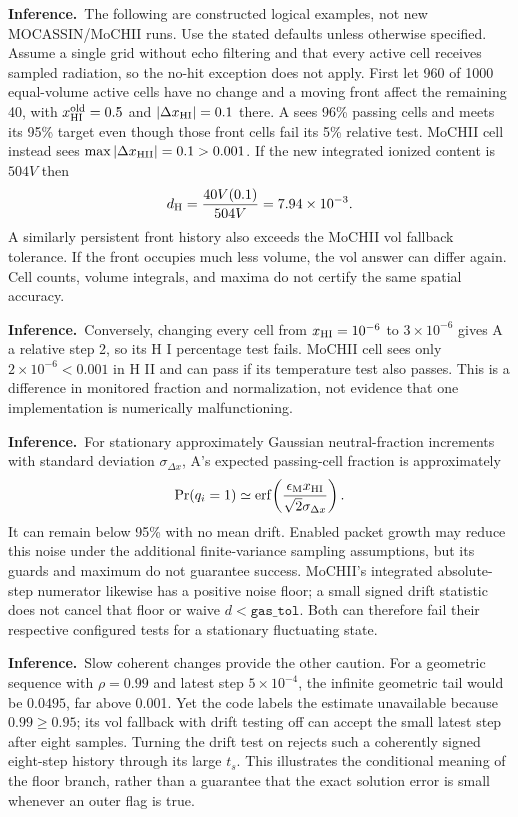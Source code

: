 \documentclass[english,a4paper]{my_memo}
\newcommand{\code}[1]{\texttt{#1}}
\newcommand{\Inferred}{\noindent\textbf{Inference.}\ }
\begin{document}
\Inferred The following are constructed logical examples, not new
MOCASSIN/MoCHII runs. Use the stated defaults unless otherwise specified.
Assume a single grid without echo filtering and that every active cell
receives sampled radiation, so the no-hit exception does not apply. First let 960 of 1000 equal-volume active
cells have no change and a
moving front affect the remaining 40, with $x_{\rm HI}^{\rm old}=0.5$
and $|\Delta x_{\rm HI}|=0.1$ there. A sees 96\% passing cells and meets
its 95\% target even though those front cells fail its 5\% relative test.
MoCHII cell instead sees $\max|\Delta x_{\rm HII}|=0.1>0.001$. If the
new integrated ionized content is $504V$ then
\begin{equation}
 d_{\rm H}=\frac{40V(0.1)}{504V}=7.94\times10^{-3}.
\end{equation}
A similarly persistent front history also exceeds the MoCHII vol
fallback tolerance. If the front occupies much less volume, the vol
answer can differ again. Cell counts, volume integrals, and maxima do
not certify the same spatial accuracy.

\Inferred Conversely, changing every cell from $x_{\rm HI}=10^{-6}$ to
$3\times10^{-6}$ gives A a relative step 2, so its H I percentage test
fails. MoCHII cell sees only $2\times10^{-6}<0.001$ in H II and can pass
if its temperature test also passes. This is a difference in monitored
fraction and normalization, not evidence that one implementation is
numerically malfunctioning.

\Inferred For stationary approximately Gaussian neutral-fraction
increments with standard deviation $\sigma_{\Delta x}$, A's expected
passing-cell fraction is approximately
\begin{equation}
 \Pr(q_i=1)\simeq\operatorname{erf}\!\left(
 \frac{\epsilon_{\rm M}x_{\rm HI}}{\sqrt2\sigma_{\Delta x}}\right).
\end{equation}
It can remain below 95\% with no mean drift. Enabled packet growth may
reduce this noise under the additional finite-variance sampling
assumptions, but its guards and maximum do not guarantee success.
MoCHII's integrated absolute-step numerator likewise has a positive
noise floor; a small signed drift statistic does not cancel that floor
or waive $d<\code{gas\_tol}$. Both can therefore fail their respective
configured tests for a stationary fluctuating state.

\Inferred Slow coherent changes provide the other caution. For a
geometric sequence with $\rho=0.99$ and latest step $5\times10^{-4}$,
the infinite geometric tail would be $0.0495$, far above 0.001. Yet the
code labels the estimate unavailable because $0.99\geq0.95$; its vol
fallback with drift testing off can accept the small latest step after
eight samples. Turning the drift test on rejects such a coherently
signed eight-step history through its large $t_s$. This illustrates the
conditional meaning of the floor branch, rather than a guarantee that
the exact solution error is small whenever an outer flag is true.
\end{document}
